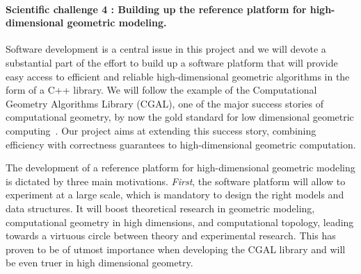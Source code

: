 \paragraph{Scientific challenge 4 : Building up the reference platform for high-dimensional geometric modeling.}





Software development is a central issue in this project and we will devote a substantial part of the effort to build up a software platform that will provide easy access to efficient and reliable high-dimensional geometric algorithms in the form of a C++ library. We will follow the example of the Computational Geometry Algorithms Library (CGAL), one of the major success stories of computational geometry, by now the gold standard for low dimensional geometric computing~\cite{cgal}. 
 Our project aims at extending this success story, combining efficiency with correctness guarantees to high-dimensional geometric computation.

The development of  a reference platform for high-dimensional geometric modeling is dictated by three main motivations.
{\em First}, the software platform will allow to experiment at a large scale, which is mandatory to 
design the right models and data structures. It will boost theoretical research  in geometric modeling, computational geometry in high dimensions, and computational topology, leading towards a virtuous circle between theory and experimental research. This has proven to be of utmost importance when developing the CGAL library and will be even truer in high dimensional geometry.

